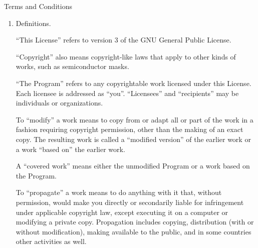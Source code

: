 \begin{abstract}
  Finally, every program is threatened constantly by software patents.
  States should not allow patents to restrict development and use of
  software on general-purpose computers, but in those that do, we wish to
  avoid the special danger that patents applied to a free program could
  make it effectively proprietary.  To prevent this, the GPL assures that
  patents cannot be used to render the program non-free.

  The precise terms and conditions for copying, distribution and
  modification follow.
\end{abstract}

\begin{center}
  {\Large \sc Terms and Conditions}
\end{center}

\begin{enumerate}

  \addtocounter{enumi}{-1}

  \item Definitions.

        ``This License'' refers to version 3 of the GNU General Public License.

        ``Copyright'' also means copyright-like laws that apply to other kinds of
        works, such as semiconductor masks.

        ``The Program'' refers to any copyrightable work licensed under this
        License.  Each licensee is addressed as ``you''.  ``Licensees'' and
        ``recipients'' may be individuals or organizations.

        To ``modify'' a work means to copy from or adapt all or part of the work
        in a fashion requiring copyright permission, other than the making of an
        exact copy.  The resulting work is called a ``modified version'' of the
        earlier work or a work ``based on'' the earlier work.

        A ``covered work'' means either the unmodified Program or a work based
        on the Program.

        To ``propagate'' a work means to do anything with it that, without
        permission, would make you directly or secondarily liable for
        infringement under applicable copyright law, except executing it on a
        computer or modifying a private copy.  Propagation includes copying,
        distribution (with or without modification), making available to the
        public, and in some countries other activities as well.


\end{enumerate}
